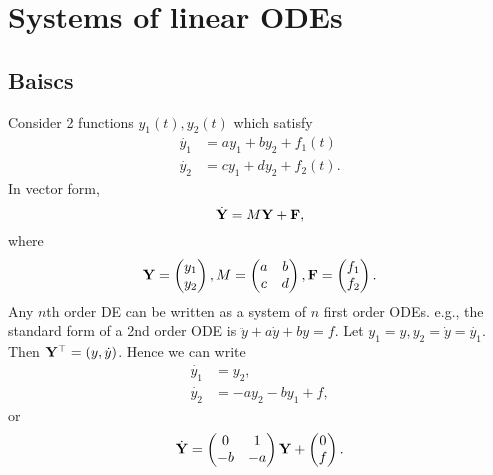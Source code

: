 \documentclass[10pt]{article}
\def\f{{\mathrm f}}
\begin{document}
      \section{Systems of linear ODEs}
      \subsection{Baiscs}
      Consider 2 functions $y_1(t),y_2(t)$ which satisfy 
      \begin{align*}
        \dot{y_1} &= a y_1+by_2+f_1(t)\\
        \dot{y_2}&= cy_1+dy_2+f_2(t).
      \end{align*}
      In vector form,
      \[
          \dot{{\bf Y}} = M{\bf Y}+{\bf F},
      \]
      where 
      \[
          {\bf Y} = \begin{pmatrix}
            y_1\\y_2
          \end{pmatrix},M=\begin{pmatrix}
              a&b\\
              c&d
          \end{pmatrix}, {\bf F} = \begin{pmatrix}
            f_1\\f_2
          \end{pmatrix}.
      \]
      Any $n$th order DE can be written as a system of $n$ first order ODEs. e.g., the standard form of a 2nd order ODE is $ \ddot{y}+a \dot{y}+by=f $. Let $y_1=y, y_2=\dot{y}=\dot{y_1}$. Then $ {\bf Y}^{\top}=(y,\dot{y}) $. Hence we can write 
      \begin{align*}
          \dot{y_1}&= y_2,\\
          \dot{y_2}&= -ay_2-by_1+f,
      \end{align*} 
      or
      \[
          \dot{{\bf Y}}=\begin{pmatrix}
              0&1\\
              -b&-a
          \end{pmatrix}{\bf Y}+\begin{pmatrix}
              0\\f
          \end{pmatrix}.
      \]
\end{document}
